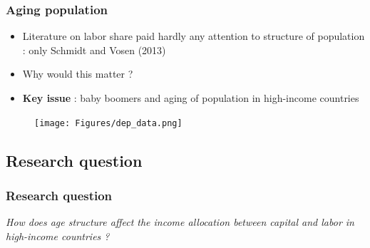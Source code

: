 \documentclass{beamer}
\begin{document}
			\begin{frame}\frametitle{Aging population}
				\begin{minipage}[h]{.49\textwidth}
					\begin{adjustwidth}{-2em}{0em}
						\begin{itemize}
							\item Literature on labor share paid hardly any attention to structure of population : only Schmidt and Vosen (2013)
							\vspace{1em}
							\item Why would this matter ?
							\vspace{1em}
							\item \textbf{Key issue} : baby boomers and aging of population in high-income countries
						\end{itemize}
					\end{adjustwidth}
				\end{minipage}
				\begin{minipage}[h]{.49\textwidth}
					\begin{figure}[h]
						\texttt{[image: Figures/dep\_data.png]}
					\end{figure}
				\end{minipage}
			\end{frame}
		
		\subsection{Research question}
		\begin{frame}\frametitle{Research question}
			\Large\textit{How does age structure affect the income allocation between capital and labor in high-income countries ?}
		\end{frame}
		
\end{document}
